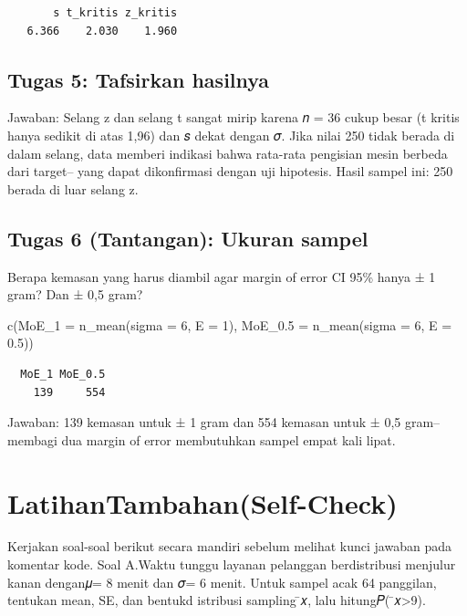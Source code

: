 \documentclass[
  indonesian,
  letterpaper,
]{book}
\newenvironment{Shaded}{\begin{snugshade}}{\end{snugshade}}
\newcommand{\AttributeTok}[1]{\textcolor[rgb]{0.40,0.45,0.13}{#1}}
\newcommand{\DecValTok}[1]{\textcolor[rgb]{0.68,0.00,0.00}{#1}}
\newcommand{\FloatTok}[1]{\textcolor[rgb]{0.68,0.00,0.00}{#1}}
\newcommand{\FunctionTok}[1]{\textcolor[rgb]{0.28,0.35,0.67}{#1}}
\newcommand{\NormalTok}[1]{\textcolor[rgb]{0.00,0.23,0.31}{#1}}
\begin{document}
\begin{verbatim}
       s t_kritis z_kritis 
   6.366    2.030    1.960 
\end{verbatim}

\subsection{Tugas 5: Tafsirkan
hasilnya}\label{tugas-5-tafsirkan-hasilnya}

Jawaban: Selang z dan selang t sangat mirip karena 𝑛 = 36 cukup besar (t
kritis hanya sedikit di atas 1,96) dan 𝑠 dekat dengan 𝜎. Jika nilai 250
tidak berada di dalam selang, data memberi indikasi bahwa rata-rata
pengisian mesin berbeda dari target-- yang dapat dikonfirmasi dengan uji
hipotesis. Hasil sampel ini: 250 berada di luar selang z.

\subsection{Tugas 6 (Tantangan): Ukuran
sampel}\label{tugas-6-tantangan-ukuran-sampel}

Berapa kemasan yang harus diambil agar margin of error CI 95\% hanya ± 1
gram? Dan ± 0,5 gram?

\begin{Shaded}
\begin{Highlighting}[]
\FunctionTok{c}\NormalTok{(}\AttributeTok{MoE\_1 =} \FunctionTok{n\_mean}\NormalTok{(}\AttributeTok{sigma =} \DecValTok{6}\NormalTok{, }\AttributeTok{E =} \DecValTok{1}\NormalTok{), }\AttributeTok{MoE\_0.5 =} \FunctionTok{n\_mean}\NormalTok{(}\AttributeTok{sigma =} \DecValTok{6}\NormalTok{, }\AttributeTok{E =} \FloatTok{0.5}\NormalTok{))}
\end{Highlighting}
\end{Shaded}

\begin{verbatim}
  MoE_1 MoE_0.5 
    139     554 
\end{verbatim}

Jawaban: 139 kemasan untuk ± 1 gram dan 554 kemasan untuk ± 0,5 gram--
membagi dua margin of error membutuhkan sampel empat kali lipat.

\section{LatihanTambahan(Self-Check)}\label{latihantambahanself-check}

Kerjakan soal-soal berikut secara mandiri sebelum melihat kunci jawaban
pada komentar kode. Soal A.Waktu tunggu layanan pelanggan berdistribusi
menjulur kanan dengan𝜇= 8 menit dan 𝜎= 6 menit. Untuk sampel acak 64
panggilan, tentukan mean, SE, dan bentukd istribusi sampling ̄𝑥, lalu
hitung𝑃( ̄𝑥\textgreater9).
\end{document}
